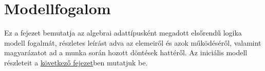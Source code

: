 \chapter{Modellfogalom}
\label{ch:notion}

Ez a fejezet bemutatja az algebrai adattípusként megadott elsőrendű logika modell fogalmát, részletes leírást adva az elemeiről és azok működéséről, valamint magyarázatot ad a munka során hozott döntések hattéről. Az iniciális modell részleteit a \hyperref[ch:syntax]{következő fejezet}ben mutatjuk be.

